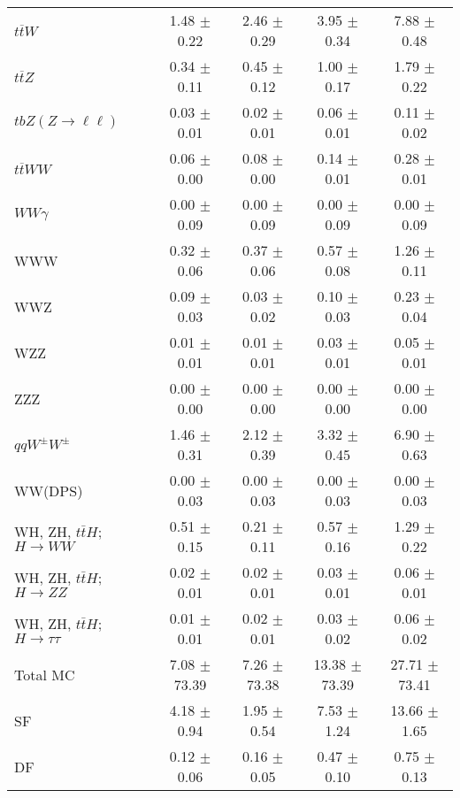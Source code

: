 \begin{tabular}{l|cccc}
                   $t\overline{t}W$ &  1.48 $\pm$  0.22 &  2.46 $\pm$  0.29 &  3.95 $\pm$  0.34 &  7.88 $\pm$  0.48 \\
                   $t\overline{t}Z$ &  0.34 $\pm$  0.11 &  0.45 $\pm$  0.12 &  1.00 $\pm$  0.17 &  1.79 $\pm$  0.22 \\
    $tbZ (Z \rightarrow \ell \ell)$ &  0.03 $\pm$  0.01 &  0.02 $\pm$  0.01 &  0.06 $\pm$  0.01 &  0.11 $\pm$  0.02 \\
                  $t\overline{t}WW$ &  0.06 $\pm$  0.00 &  0.08 $\pm$  0.00 &  0.14 $\pm$  0.01 &  0.28 $\pm$  0.01 \\
                         $WW\gamma$ &  0.00 $\pm$  0.09 &  0.00 $\pm$  0.09 &  0.00 $\pm$  0.09 &  0.00 $\pm$  0.09 \\
                                WWW &  0.32 $\pm$  0.06 &  0.37 $\pm$  0.06 &  0.57 $\pm$  0.08 &  1.26 $\pm$  0.11 \\
                                WWZ &  0.09 $\pm$  0.03 &  0.03 $\pm$  0.02 &  0.10 $\pm$  0.03 &  0.23 $\pm$  0.04 \\
                                WZZ &  0.01 $\pm$  0.01 &  0.01 $\pm$  0.01 &  0.03 $\pm$  0.01 &  0.05 $\pm$  0.01 \\
                                ZZZ &  0.00 $\pm$  0.00 &  0.00 $\pm$  0.00 &  0.00 $\pm$  0.00 &  0.00 $\pm$  0.00 \\
                 $qqW^{\pm}W^{\pm}$ &  1.46 $\pm$  0.31 &  2.12 $\pm$  0.39 &  3.32 $\pm$  0.45 &  6.90 $\pm$  0.63 \\
                            WW(DPS) &  0.00 $\pm$  0.03 &  0.00 $\pm$  0.03 &  0.00 $\pm$  0.03 &  0.00 $\pm$  0.03 \\
WH, ZH, $t\bar{t}H$; $H \rightarrow WW$ &  0.51 $\pm$  0.15 &  0.21 $\pm$  0.11 &  0.57 $\pm$  0.16 &  1.29 $\pm$  0.22 \\
WH, ZH, $t\bar{t}H$; $H \rightarrow ZZ$ &  0.02 $\pm$  0.01 &  0.02 $\pm$  0.01 &  0.03 $\pm$  0.01 &  0.06 $\pm$  0.01 \\
WH, ZH, $t\bar{t}H$; $H \rightarrow \tau\tau$ &  0.01 $\pm$  0.01 &  0.02 $\pm$  0.01 &  0.03 $\pm$  0.02 &  0.06 $\pm$  0.02 \\
\hline\hline
                           Total MC &  7.08 $\pm$ 73.39 &  7.26 $\pm$ 73.38 & 13.38 $\pm$ 73.39 & 27.71 $\pm$ 73.41 \\
\hline
                                 SF &  4.18 $\pm$  0.94 &  1.95 $\pm$  0.54 &  7.53 $\pm$  1.24 & 13.66 $\pm$  1.65 \\
                                 DF &  0.12 $\pm$  0.06 &  0.16 $\pm$  0.05 &  0.47 $\pm$  0.10 &  0.75 $\pm$  0.13 \\

\end{tabular}
